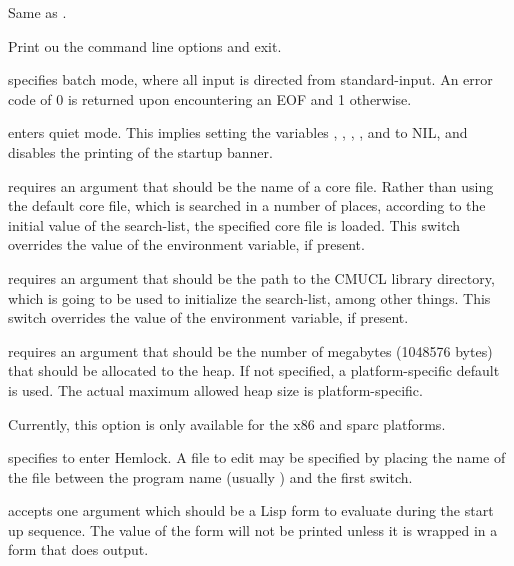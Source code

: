 \begin{Lentry}
\item[\code{-{}-help}] Same as .

\item[\code{-help}] Print ou the command line options and exit.
  
\item[\code{-batch}] specifies batch mode, where all input is
  directed from standard-input.  An error code of 0 is returned upon
  encountering an EOF and 1 otherwise.

\item[\code{-quiet}] enters quiet mode. This implies setting the
  variables , ,
  , ,
   and  to NIL, and
  disables the printing of the startup banner.

\item[\code{-core}] requires an argument that should be the name of a
  core file.  Rather than using the default core file, which is searched
  in a number of places, according to the initial value of the
   search-list, the specified core file is loaded.  This
  switch overrides the value of the  environment variable,
  if present.
  
\item[\code{-lib}] requires an argument that should be the path to the
  CMUCL library directory, which is going to be used to initialize the
   search-list, among other things.  This switch overrides
  the value of the  environment variable, if present.

\item[\code{-dynamic-space-size}] requires an argument that should be
  the number of megabytes (1048576 bytes) that should be allocated to
  the heap.  If not specified, a platform-specific default is used.
  The actual maximum allowed heap size is platform-specific.

  Currently, this option is only available for the x86 and sparc
  platforms. 

\item[\code{-edit}] specifies to enter Hemlock.  A file to edit may be
  specified by placing the name of the file between the program name
  (usually ) and the first switch.
  
\item[\code{-eval}] accepts one argument which should be a Lisp form
  to evaluate during the start up sequence.  The value of the form
  will not be printed unless it is wrapped in a form that does output.
  

\end{Lentry}
